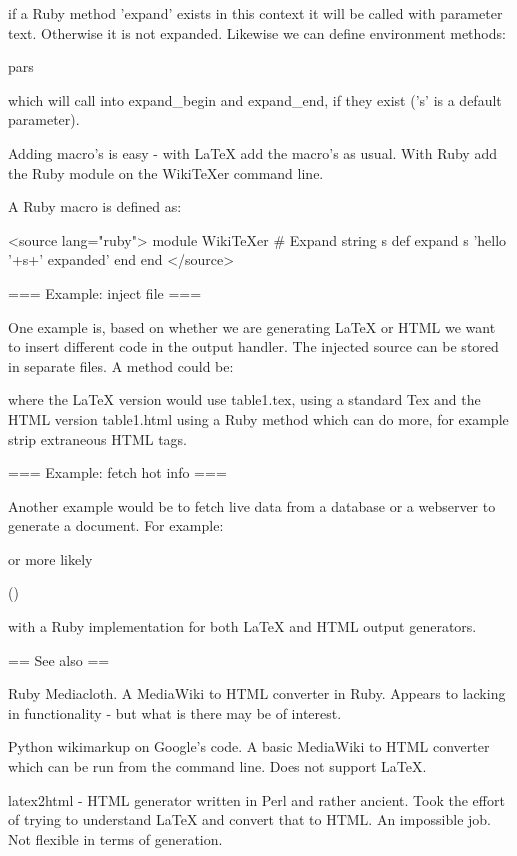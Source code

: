 
if a Ruby method 'expand' exists in this context it will be called
with parameter text. Otherwise it is not expanded. Likewise we can 
define environment methods:

  \begin{expand}[s]{pars}
	\end{expand}

which will call into expand_begin and expand_end, if they exist ('s'
is a default parameter).

Adding macro's is easy - with LaTeX add the macro's as usual. With
Ruby add the Ruby module on the WikiTeXer command line.

A Ruby macro is defined as:

<source lang="ruby">
  module WikiTeXer
		# Expand string s
		def expand s
			'hello '+s+' expanded'
		end
	end
</source>


=== Example: inject file ===
  
One example is, based on whether we are generating LaTeX or HTML we
want to insert different code in the output handler. The injected
source can be stored in separate files. A method could be:


where the LaTeX version would use table1.tex, using a standard Tex
 and the HTML version table1.html using a Ruby method
which can do more, for example strip extraneous HTML tags.

=== Example: fetch hot info ===

Another example would be to fetch live data from a database or a
webserver to generate a document. For example:


or more likely

  \userinfo(\username)

with a Ruby implementation for both LaTeX and HTML output generators.


== See also ==

Ruby Mediacloth. A MediaWiki to HTML converter in Ruby. Appears to
lacking in functionality - but what is there may be of interest.

Python wikimarkup on Google's code. A basic MediaWiki to HTML
converter which can be run from the command line. Does not support
LaTeX.

latex2html - HTML generator written in Perl and rather ancient. Took
the effort of trying to understand LaTeX and convert that to HTML. An
impossible job. Not flexible in terms of generation.
